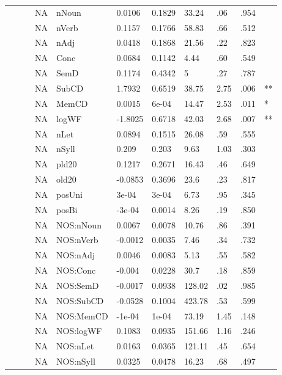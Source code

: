 \begin{table}[ht]
\begin{tabular}{lllllllllll}
   &  &  & NA & nNoun & 0.0106 & 0.1829 & 33.24 & .06 & .954 &   \\ 
   &  &  & NA & nVerb & 0.1157 & 0.1766 & 58.83 & .66 & .512 &   \\ 
   &  &  & NA & nAdj & 0.0418 & 0.1868 & 21.56 & .22 & .823 &   \\ 
   &  &  & NA & Conc & 0.0684 & 0.1142 & 4.44 & .60 & .549 &   \\ 
   &  &  & NA & SemD & 0.1174 & 0.4342 & 5 & .27 & .787 &   \\ 
   &  &  & NA & SubCD & 1.7932 & 0.6519 & 38.75 & 2.75 & .006 & ** \\ 
   &  &  & NA & MemCD & 0.0015 & 6e-04 & 14.47 & 2.53 & .011 & * \\ 
   &  &  & NA & logWF & -1.8025 & 0.6718 & 42.03 & 2.68 & .007 & ** \\ 
   &  &  & NA & nLet & 0.0894 & 0.1515 & 26.08 & .59 & .555 &   \\ 
   &  &  & NA & nSyll & 0.209 & 0.203 & 9.63 & 1.03 & .303 &   \\ 
   &  &  & NA & pld20 & 0.1217 & 0.2671 & 16.43 & .46 & .649 &   \\ 
   &  &  & NA & old20 & -0.0853 & 0.3696 & 23.6 & .23 & .817 &   \\ 
   &  &  & NA & posUni & 3e-04 & 3e-04 & 6.73 & .95 & .345 &   \\ 
   &  &  & NA & posBi & -3e-04 & 0.0014 & 8.26 & .19 & .850 &   \\ 
   &  &  & NA & NOS:nNoun & 0.0067 & 0.0078 & 10.76 & .86 & .391 &   \\ 
   &  &  & NA & NOS:nVerb & -0.0012 & 0.0035 & 7.46 & .34 & .732 &   \\ 
   &  &  & NA & NOS:nAdj & 0.0046 & 0.0083 & 5.13 & .55 & .582 &   \\ 
   &  &  & NA & NOS:Conc & -0.004 & 0.0228 & 30.7 & .18 & .859 &   \\ 
   &  &  & NA & NOS:SemD & -0.0017 & 0.0938 & 128.02 & .02 & .985 &   \\ 
   &  &  & NA & NOS:SubCD & -0.0528 & 0.1004 & 423.78 & .53 & .599 &   \\ 
   &  &  & NA & NOS:MemCD & -1e-04 & 1e-04 & 73.19 & 1.45 & .148 &   \\ 
   &  &  & NA & NOS:logWF & 0.1083 & 0.0935 & 151.66 & 1.16 & .246 &   \\ 
   &  &  & NA & NOS:nLet & 0.0163 & 0.0365 & 121.11 & .45 & .654 &   \\ 
   &  &  & NA & NOS:nSyll & 0.0325 & 0.0478 & 16.23 & .68 & .497 &   \\ 

\end{tabular}
\end{table}
